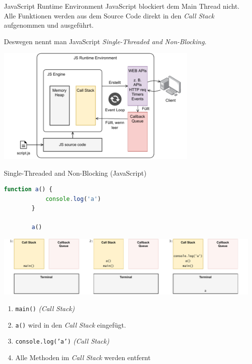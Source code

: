 \begin{defi}{JavaScript Runtime Environment}
    JavaScript blockiert dem Main Thread nicht.
    Alle Funktionen werden aus dem Source Code direkt in den \emph{Call Stack} aufgenommen und ausgeführt.

    Deswegen nennt man JavaScript \emph{Single-Threaded and Non-Blocking}.

    \begin{center}
        \includegraphics[width=0.75\textwidth]{includes/figures/defi_js_runtime_environment.pdf}
    \end{center}
\end{defi}

\begin{example}{Single-Threaded and Non-Blocking (JavaScript)}
    \begin{lstlisting}[language=JavaScript]
        function a() {
            console.log('a')            
        }

        a()
    \end{lstlisting}

    \includegraphics[width=\textwidth]{includes/figures/example_stanb_1.pdf}

    \begin{enumerate}
        \item \texttt{main()} \emph{(Call Stack)}
        \item \texttt{a()} wird in den \emph{Call Stack} eingefügt.
        \item \texttt{console.log('a')} \emph{(Call Stack)}
        \item Alle Methoden im \emph{Call Stack} werden entfernt
    \end{enumerate}
\end{example}


